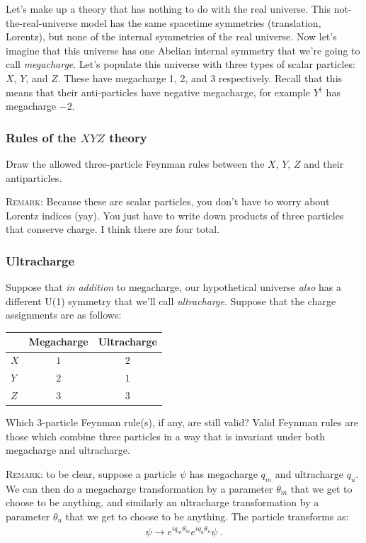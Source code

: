 \documentclass[12pt]{article}
\begin{document}
Let's make up a theory that has nothing to do with the real universe. This not-the-real-universe model has the same spacetime symmetries (translation, Lorentz), but none of the internal symmetries of the real universe. 
%
Now let's imagine that this universe has one Abelian internal symmetry that we're going to call \emph{megacharge}.  Let's populate this universe with three types of scalar particles: $X$, $Y$, and $Z$. These have megacharge 1, 2, and 3 respectively. Recall that this means that their anti-particles have negative megacharge, for example $Y^\dag$ has megacharge $-2$. 

\subsubsection{Rules of the $XYZ$ theory}

Draw the allowed three-particle Feynman rules between the $X$, $Y$, $Z$ and their antiparticles. 

\textsc{Remark}: Because these are scalar particles, you don't have to worry about Lorentz indices (yay). You just have to write down products of three particles that conserve charge. I think there are four total. 

\subsubsection{Ultracharge}

Suppose that \emph{in addition} to megacharge, our hypothetical universe \emph{also} has a different U(1) symmetry that we'll call \emph{ultracharge}. Suppose that the charge assignments are as follows:
\begin{center}
\begin{tabular}{|l|c|c|}
\hline
    & Megacharge & Ultracharge \\ \hline
$X$ & $1$        & $2$        \\ \hline
$Y$ & $2$        & $1$        \\ \hline
$Z$ & $3$        & $3$        \\ \hline
\end{tabular}
\end{center}
Which 3-particle Feynman rule(s), if any, are still valid? Valid Feynman rules are those which combine three particles in a way that is invariant under both megacharge and ultracharge. 

\textsc{Remark}: to be clear, suppose a particle $\psi$ has megacharge $q_m$ and ultracharge $q_u$. We can then do a megacharge transformation by a parameter $\theta_m$ that we get to choose to be anything, and similarly an ultracharge transformation by a parameter $\theta_u$ that we get to choose to be anything. The particle transforms as:
\begin{align}
	\psi \to e^{iq_m\theta_m} e^{iq_u\theta_u} \psi \ .
\end{align}
\end{document}
